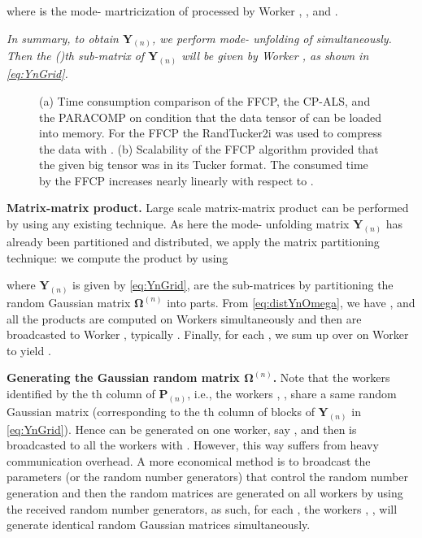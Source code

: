 \documentclass[10pt,twocolumn,twoside]{IEEEtran}
\newcommand{\tenmat}[2][n]{\ensuremath{{\mathbf{#2}}_{(#1)}}}
\newcommand{\matn}[2][n]{\ensuremath{\mathbf{#2}^{(#1)}}}
\begin{document}
where  is the mode- martricization of  processed by  Worker , , and . 

\emph{In summary, to obtain \tenmat{Y}, we  perform mode- unfolding of  simultaneously. 
Then the ()th sub-matrix of \tenmat{Y} will be given by Worker , as shown in \eqref{eq:YnGrid}.}

 \begin{figure*}[!t]
    \centerline{
    \hfil
    }
    \caption{(a) Time consumption comparison of the FFCP, the CP-ALS, and the PARACOMP on condition that the data tensor of  can be loaded into memory. For the FFCP the RandTucker2i was used to compress the data with . (b) Scalability of the FFCP algorithm provided that the given big tensor was in its Tucker format. The consumed time by the FFCP increases nearly linearly with respect to .}
    \label{fig:scalability}
  \end{figure*}


{\bf Matrix-matrix product.} Large scale matrix-matrix product can be performed by using any existing technique. As here the mode- unfolding matrix \tenmat{Y} has already been partitioned and distributed, we apply the matrix partitioning technique: we compute the product  by using

where \tenmat{Y} is given by \eqref{eq:YnGrid},  are the sub-matrices by partitioning the random Gaussian matrix \matn{\Omega} into  parts. From \eqref{eq:distYnOmega}, we have , and all the products  are computed on Workers  simultaneously and then  are broadcasted to  Worker , typically . Finally, for each , we sum  up over  on Worker   to yield .

{\bf Generating the Gaussian random matrix \matn{\Omega}.} Note that the workers identified by the th column of \tenmat{P}, i.e., the  workers , , share a same random Gaussian matrix  (corresponding to the th column of blocks of \tenmat{Y} in \eqref{eq:YnGrid}).  Hence  can be generated on one worker, say , and then is broadcasted to all the workers  with . However, this way  suffers from heavy communication overhead. A more economical method is to broadcast the parameters (or the random number generators) that control the random number generation and then the random matrices  are generated on all workers by using the received random number generators, as such, for each , the workers , , will generate identical random Gaussian matrices  simultaneously. 
\end{document}
